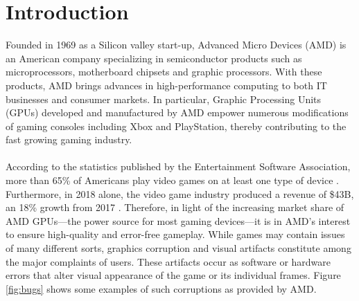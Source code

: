 \chapter{Introduction}\label{Ch:Introduction}

Founded in 1969 as a Silicon valley start-up, Advanced Micro Devices (AMD) is an American company specializing in semiconductor products such as microprocessors, motherboard chipsets and graphic processors. With these products, AMD brings advances in high-performance computing to both IT businesses and consumer markets. In particular, Graphic Processing Units (GPUs) developed and manufactured by AMD empower numerous modifications of gaming consoles including Xbox and PlayStation, thereby contributing to the fast growing gaming industry.\\
\\
According to the statistics published by the Entertainment Software Association, more than 65\% of Americans play video games on at least one type of device \cite{stats}. Furthermore, in 2018 alone, the video game industry produced a revenue of \$43B, an 18\% growth from 2017 \cite{growth}. Therefore, in light of the increasing market share of AMD GPUs---the power source for most gaming devices---it is in AMD's interest to ensure high-quality and error-free gameplay. While games may contain issues of many different sorts, graphics corruption and visual artifacts constitute among the major complaints of users. These artifacts occur as software or hardware errors that alter visual appearance of the game or its individual frames. Figure \ref{fig:bugs} shows some examples of such corruptions as provided by AMD.

